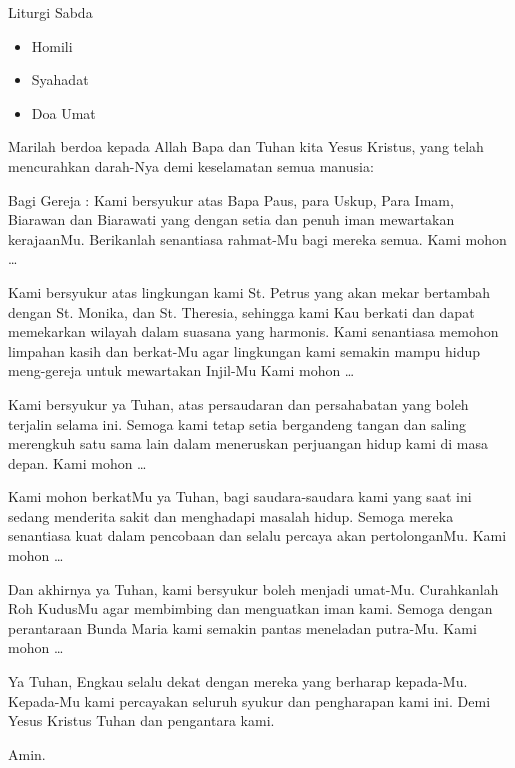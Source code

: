 \documentclass[12pt,a4paper]{beamer}
\begin{document}
\begin{frame}{Liturgi Sabda}

\begin{itemize}
\item Homili
\item Syahadat
\item Doa Umat
\end{itemize}
\begin{description}[1cm]
\item [I] Marilah berdoa kepada Allah Bapa dan Tuhan kita Yesus Kristus, yang telah mencurahkan darah-Nya demi keselamatan semua manusia:
\item [P] Bagi Gereja : Kami bersyukur atas Bapa Paus, para Uskup, Para Imam, Biarawan dan Biarawati yang dengan setia dan penuh iman mewartakan kerajaanMu. Berikanlah senantiasa rahmat-Mu  bagi mereka semua. Kami mohon \ldots
\end{description}
\end{frame}

\begin{frame}{}
\begin{description}[1cm]
\item [P]	Kami bersyukur atas lingkungan kami St. Petrus yang akan mekar bertambah dengan St. Monika, dan St. Theresia, sehingga kami Kau berkati dan dapat memekarkan wilayah dalam suasana yang harmonis. Kami senantiasa memohon limpahan kasih dan berkat-Mu agar lingkungan kami semakin mampu hidup meng-gereja untuk mewartakan Injil-Mu  Kami mohon \ldots

\item [P]	Kami bersyukur ya Tuhan, atas persaudaran dan persahabatan yang boleh terjalin selama  ini. Semoga kami tetap setia bergandeng tangan dan saling merengkuh satu sama lain dalam meneruskan perjuangan hidup kami di masa depan. Kami mohon \dots
\end{description}
\end{frame}

\begin{frame}{}
\begin{description}[1cm]
\item [P]  Kami mohon berkatMu ya Tuhan, bagi saudara-saudara kami yang saat ini sedang menderita sakit dan menghadapi masalah hidup. Semoga mereka senantiasa kuat dalam pencobaan dan selalu percaya akan pertolonganMu. Kami mohon \dots
\item [P]	Dan akhirnya ya Tuhan, kami bersyukur boleh menjadi umat-Mu. Curahkanlah Roh KudusMu agar membimbing dan menguatkan iman kami. Semoga dengan perantaraan Bunda Maria kami semakin pantas meneladan putra-Mu. Kami mohon \ldots
\item [I] 	Ya Tuhan, Engkau selalu dekat dengan mereka yang berharap kepada-Mu. Kepada-Mu kami percayakan seluruh syukur dan pengharapan kami ini. Demi Yesus Kristus Tuhan dan pengantara kami.
\item [U]	Amin.
\end{description}
\end{frame}
\end{document}
